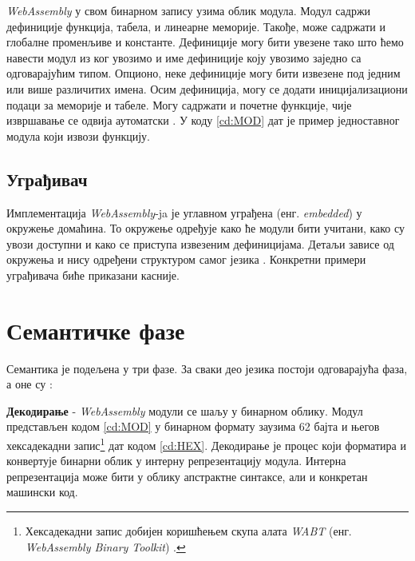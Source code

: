 \documentclass[12pt,oneside]{memoir}
\begin{document}
\textit{WebAssembly} у свом бинарном запису узима облик модула. Модул садржи дефиниције функција, табела, и линеарне
меморије. Такође, може садржати и глобалне променљиве и константе. Дефиниције могу бити увезене тако што ћемо
навести модул из ког увозимо и име дефиниције коју увозимо заједно са одговарајућим типом. Опционо, неке дефиниције
могу бити извезене под једним или више различитих имена. Осим дефиниција, могу се додати иницијализациони подаци за
меморије и табеле. Могу садржати и почетне функције, чије извршавање се одвија аутоматски \cite{WASMS}. У коду
\ref{cd:MOD} дат је пример једноставног модула који извози функцију.


\subsection{Уграђивач}

Имплементација \textit{WebAssembly}-ja је углавном уграђена (енг. \textit{embedded}) у окружење домаћина. То
окружење одређује како ће модули бити учитани, како су увози доступни и како се приступа извезеним дефиницијама.
Детаљи зависе од окружења и нису одређени структуром самог језика \cite{WASMS}. Конкретни примери уграђивача биће
приказани касније.

\section{Семантичке фазе} \label{chp:PHASES}

Семантика је подељена у три фазе. За сваки део језика постоји одговарајућа фаза, а оне су \cite{WASMS}:

\textbf{Декодирање} - \textit{WebAssembly} модули се шаљу у бинарном облику. Модул представљен кодом \ref{cd:MOD}
у бинарном формату заузима 62 бајта и његов хексадекадни запис\footnote{Хексадекадни запис добијен коришћењем скупа
алата \textit{WABT} (енг. \textit{WebAssembly Binary Toolkit}) \cite{WABT}.} дат кодом \ref{cd:HEX}.
Декодирање је процес који форматира и конвертује бинарни облик у интерну репрезентацију модула. Интерна
репрезентација може бити у облику апстрактне синтаксе, али и конкретан машински код.
\end{document}
